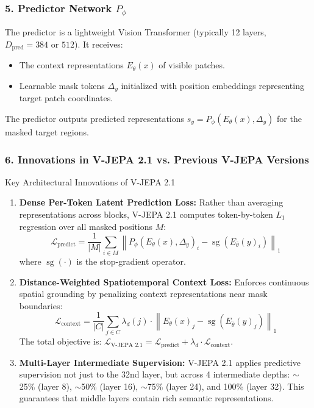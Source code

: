 \documentclass[a4paper, 11pt]{article}
\begin{document}
\subsubsection{5. Predictor Network \texorpdfstring{$P_\phi$}{P\_phi}}
The predictor is a lightweight Vision Transformer (typically 12 layers, $D_{\text{pred}}=384$ or $512$). It receives:
\begin{itemize}
    \item The context representations $E_\theta(x)$ of visible patches.
    \item Learnable mask tokens $\Delta_y$ initialized with position embeddings representing target patch coordinates.
\end{itemize}
The predictor outputs predicted representations $\hat{s}_y = P_\phi(E_\theta(x), \Delta_y)$ for the masked target regions.

\subsubsection{6. Innovations in V-JEPA 2.1 vs. Previous V-JEPA Versions}
\begin{techbox}{Key Architectural Innovations of V-JEPA 2.1}
\begin{enumerate}
    \item \textbf{Dense Per-Token Latent Prediction Loss:} Rather than averaging representations across blocks, V-JEPA 2.1 computes token-by-token $L_1$ regression over all masked positions $M$:
    \begin{equation}
        \mathcal{L}_{\text{predict}} = \frac{1}{|M|} \sum_{i \in M} \left\| P_\phi(E_\theta(x), \Delta_y)_i - \operatorname{sg}(E_{\bar{\theta}}(y)_i) \right\|_1
    \end{equation}
    where $\operatorname{sg}(\cdot)$ is the stop-gradient operator.
    \item \textbf{Distance-Weighted Spatiotemporal Context Loss:} Enforces continuous spatial grounding by penalizing context representations near mask boundaries:
    \begin{equation}
        \mathcal{L}_{\text{context}} = \frac{1}{|C|} \sum_{j \in C} \lambda_d(j) \cdot \left\| E_\theta(x)_j - \operatorname{sg}(E_{\bar{\theta}}(y)_j) \right\|_1
    \end{equation}
    The total objective is: $\mathcal{L}_{\text{V-JEPA 2.1}} = \mathcal{L}_{\text{predict}} + \lambda_d \cdot \mathcal{L}_{\text{context}}$.
    \item \textbf{Multi-Layer Intermediate Supervision:} V-JEPA 2.1 applies predictive supervision not just to the 32nd layer, but across 4 intermediate depths: $\sim$25\% (layer 8), $\sim$50\% (layer 16), $\sim$75\% (layer 24), and 100\% (layer 32). This guarantees that middle layers contain rich semantic representations.
\end{enumerate}
\end{techbox}
\end{document}
